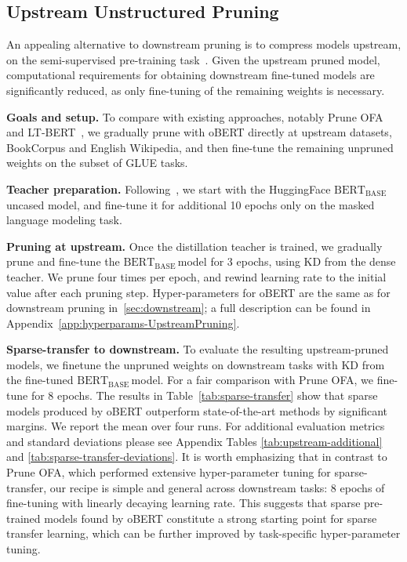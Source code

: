 \documentclass[11pt]{article}
\newcommand{\bert}{$\textrm{BERT}_{\textrm{BASE}}\,$}
\begin{document}
\begin{table}
{{\begin{tabular}{ccc|cc|cc}
    \bottomrule
    \end{tabular}
    }
    }
    \vspace{-1.2em}
\end{table}

\subsection{Upstream Unstructured Pruning}
\label{sec:upstream}

An appealing alternative to downstream pruning is to compress models upstream, on the semi-supervised pre-training task~\cite{zafrir2021prune}. Given the upstream pruned model, computational  requirements for obtaining downstream fine-tuned models are significantly reduced, as only fine-tuning of the remaining weights is necessary.

\noindent\textbf{Goals and setup.} To compare with existing approaches, notably Prune OFA~\cite{zafrir2021prune} and LT-BERT~\cite{chen2020lottery}, we gradually prune with oBERT directly at upstream datasets, BookCorpus and English Wikipedia, and then fine-tune the remaining unpruned weights on the subset of GLUE tasks.

\noindent\textbf{Teacher preparation.} Following~\citet{Liu2019RoBERTaAR}, we start with the HuggingFace \bert uncased model, and fine-tune it for additional 10 epochs only on the masked language modeling task.

\noindent\textbf{Pruning at upstream.} Once the distillation teacher is trained, we gradually prune and fine-tune the \bert model for 3 epochs, using KD from the dense teacher. We prune four times per epoch, and rewind learning rate to the initial value after each pruning step. Hyper-parameters for oBERT are the same as for downstream pruning in~\ref{sec:downstream}; a full description can be found in Appendix~\ref{app:hyperparams-UpstreamPruning}.

\noindent\textbf{Sparse-transfer to downstream.} To evaluate the resulting upstream-pruned models, we finetune the unpruned weights on downstream tasks with KD from the fine-tuned \bert model. For a fair comparison with Prune OFA, we fine-tune for 8 epochs. The results in Table~\ref{tab:sparse-transfer} show that sparse models produced by oBERT outperform state-of-the-art methods by significant margins. We report the mean over four runs. For additional evaluation metrics and standard deviations please see Appendix Tables \ref{tab:upstream-additional} and \ref{tab:sparse-transfer-deviations}. It is worth emphasizing that in contrast to Prune OFA, which performed extensive hyper-parameter tuning for sparse-transfer, our recipe is simple and general across downstream tasks: 8 epochs of fine-tuning with linearly decaying learning rate. 
This suggests that sparse pre-trained models found by oBERT constitute a strong starting point for sparse transfer learning, which can be further improved by task-specific hyper-parameter tuning.
\end{document}
